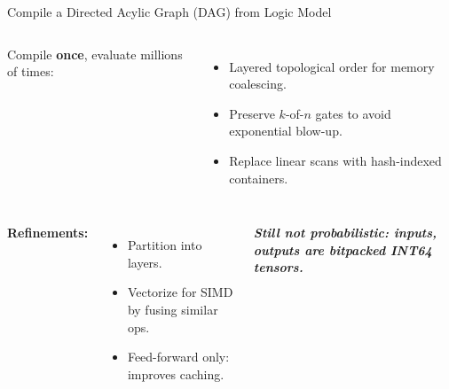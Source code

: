 \begin{frame}{Compile a Directed Acylic Graph (DAG) from Logic Model}
  \begin{columns}

      \par %

      Compile \textbf{once}, evaluate millions of times:
      \begin{itemize}
          \item Layered topological order for memory coalescing.
          \item Preserve $k$-of-$n$ gates to avoid exponential blow-up.
          \item Replace linear scans with hash-indexed containers.
      \end{itemize}
  \end{columns}
\end{frame}

\begin{frame}
  \begin{columns}
    {
        \par
        \vspace{10pt}
        \textbf{Refinements:}
      \begin{itemize}
          \item {Partition into layers.}
          \item {Vectorize for SIMD by fusing similar ops.}
          \item {Feed-forward only: improves caching.}
      \end{itemize}\par
      \vspace{2pt}
      \tiny{\textbf{\emph{Still not probabilistic: inputs, outputs are bitpacked INT64 tensors.}}}
    }
      \par %
  \end{columns}
\end{frame}

